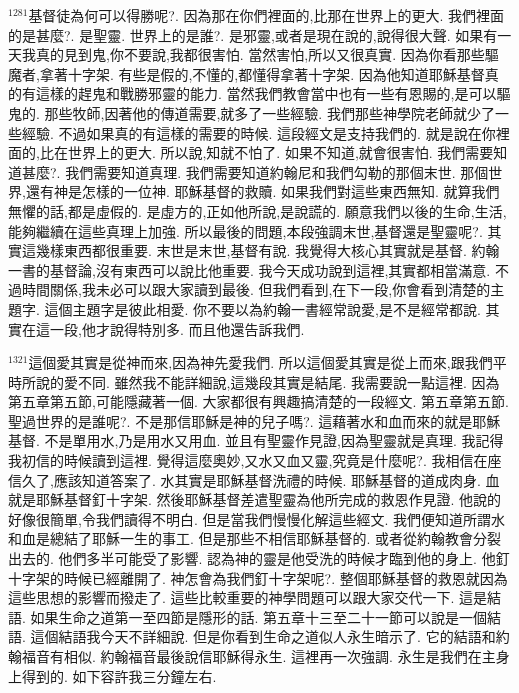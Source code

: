 \documentclass{book}
\begin{document}
$^{1281}$基督徒為何可以得勝呢?.
因為那在你們裡面的,比那在世界上的更大.
我們裡面的是甚麼?.
是聖靈.
世界上的是誰?.
是邪靈,或者是現在說的,說得很大聲.
如果有一天我真的見到鬼,你不要說,我都很害怕.
當然害怕,所以又很真實.
因為你看那些驅魔者,拿著十字架.
有些是假的,不懂的,都懂得拿著十字架.
因為他知道耶穌基督真的有這樣的趕鬼和戰勝邪靈的能力.
當然我們教會當中也有一些有恩賜的,是可以驅鬼的.
那些牧師,因著他的傳道需要,就多了一些經驗.
我們那些神學院老師就少了一些經驗.
不過如果真的有這樣的需要的時候.
這段經文是支持我們的.
就是說在你裡面的,比在世界上的更大.
所以說,知就不怕了.
如果不知道,就會很害怕.
我們需要知道甚麼?.
我們需要知道真理.
我們需要知道約翰尼和我們勾勒的那個末世.
那個世界,還有神是怎樣的一位神.
耶穌基督的救贖.
如果我們對這些東西無知.
就算我們無懼的話,都是虛假的.
是虛方的,正如他所說,是說謊的.
願意我們以後的生命,生活,能夠繼續在這些真理上加強.
所以最後的問題,本段強調末世,基督還是聖靈呢?.
其實這幾樣東西都很重要.
末世是末世,基督有說.
我覺得大核心其實就是基督.
約翰一書的基督論,沒有東西可以說比他重要.
我今天成功說到這裡,其實都相當滿意.
不過時間關係,我未必可以跟大家讀到最後.
但我們看到,在下一段,你會看到清楚的主題字.
這個主題字是彼此相愛.
你不要以為約翰一書經常說愛,是不是經常都說.
其實在這一段,他才說得特別多.
而且他還告訴我們.

$^{1321}$這個愛其實是從神而來,因為神先愛我們.
所以這個愛其實是從上而來,跟我們平時所說的愛不同.
雖然我不能詳細說,這幾段其實是結尾.
我需要說一點這裡.
因為第五章第五節,可能隱藏著一個.
大家都很有興趣搞清楚的一段經文.
第五章第五節.
聖過世界的是誰呢?.
不是那信耶穌是神的兒子嗎?.
這藉著水和血而來的就是耶穌基督.
不是單用水,乃是用水又用血.
並且有聖靈作見證,因為聖靈就是真理.
我記得我初信的時候讀到這裡.
覺得這麼奧妙,又水又血又靈,究竟是什麼呢?.
我相信在座信久了,應該知道答案了.
水其實是耶穌基督洗禮的時候.
耶穌基督的道成肉身.
血就是耶穌基督釘十字架.
然後耶穌基督差遣聖靈為他所完成的救恩作見證.
他說的好像很簡單,令我們讀得不明白.
但是當我們慢慢化解這些經文.
我們便知道所謂水和血是總結了耶穌一生的事工.
但是那些不相信耶穌基督的.
或者從約翰教會分裂出去的.
他們多半可能受了影響.
認為神的靈是他受洗的時候才臨到他的身上.
他釘十字架的時候已經離開了.
神怎會為我們釘十字架呢?.
整個耶穌基督的救恩就因為這些思想的影響而撥走了.
這些比較重要的神學問題可以跟大家交代一下.
這是結語.
如果生命之道第一至四節是隱形的話.
第五章十三至二十一節可以說是一個結語.
這個結語我今天不詳細說.
但是你看到生命之道似人永生暗示了.
它的結語和約翰福音有相似.
約翰福音最後說信耶穌得永生.
這裡再一次強調.
永生是我們在主身上得到的.
如下容許我三分鐘左右.
\end{document}
